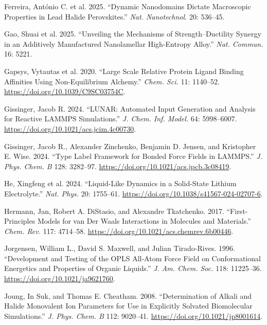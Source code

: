 \documentclass[
  11pt,
]{article}
\newlength{\cslhangindent}
\newenvironment{CSLReferences}[2] %
 {\begin{list}{}{%
  \setlength{\itemindent}{0pt}
  \setlength{\leftmargin}{0pt}
  \setlength{\parsep}{0pt}
  \ifodd #1
   \setlength{\leftmargin}{\cslhangindent}
   \setlength{\itemindent}{-1\cslhangindent}
  \fi
  \setlength{\itemsep}{#2\baselineskip}}}
 {\end{list}}
\begin{document}
\begin{CSLReferences}{1}{1}
{Ferreira, António C. et al.} 2025. {``Dynamic Nanodomains Dictate
Macroscopic Properties in Lead Halide Perovskites.''} \emph{Nat.
Nanotechnol.} 20: 536--45.

{Gao, Shuai et al.} 2025. {``Unveiling the Mechanisms of
Strength--Ductility Synergy in an Additively Manufactured Nanolamellar
High-Entropy Alloy.''} \emph{Nat. Commun.} 16: 5221.

{Gapsys, Vytautas et al.} 2020. {``Large Scale Relative Protein Ligand
Binding Affinities Using Non-Equilibrium Alchemy.''} \emph{Chem. Sci.}
11: 1140--52. \url{https://doi.org/10.1039/C9SC03754C}.

Gissinger, Jacob R. 2024. {``{LUNAR}: Automated Input Generation and
Analysis for Reactive {LAMMPS} Simulations.''} \emph{J. Chem. Inf.
Model.} 64: 5998--6007. \url{https://doi.org/10.1021/acs.jcim.4c00730}.

Gissinger, Jacob R., Alexander Zinchenko, Benjamin D. Jensen, and
Kristopher E. Wise. 2024. {``Type Label Framework for Bonded Force
Fields in {LAMMPS}.''} \emph{J. Phys. Chem. B} 128: 3282--97.
\url{https://doi.org/10.1021/acs.jpcb.3c08419}.

{He, Xingfeng et al.} 2024. {``Liquid-Like Dynamics in a Solid-State
Lithium Electrolyte.''} \emph{Nat. Phys.} 20: 1755--61.
\url{https://doi.org/10.1038/s41567-024-02707-6}.

Hermann, Jan, Robert A. DiStasio, and Alexandre Tkatchenko. 2017.
{``First-Principles Models for van Der {Waals} Interactions in Molecules
and Materials.''} \emph{Chem. Rev.} 117: 4714--58.
\url{https://doi.org/10.1021/acs.chemrev.6b00446}.

Jorgensen, William L., David S. Maxwell, and Julian Tirado-Rives. 1996.
{``Development and Testing of the {OPLS} All-Atom Force Field on
Conformational Energetics and Properties of Organic Liquids.''} \emph{J.
Am. Chem. Soc.} 118: 11225--36. \url{https://doi.org/10.1021/ja9621760}.

Joung, In Suk, and Thomas E. Cheatham. 2008. {``Determination of Alkali
and Halide Monovalent Ion Parameters for Use in Explicitly Solvated
Biomolecular Simulations.''} \emph{J. Phys. Chem. B} 112: 9020--41.
\url{https://doi.org/10.1021/jp8001614}.


\end{CSLReferences}
\end{document}
